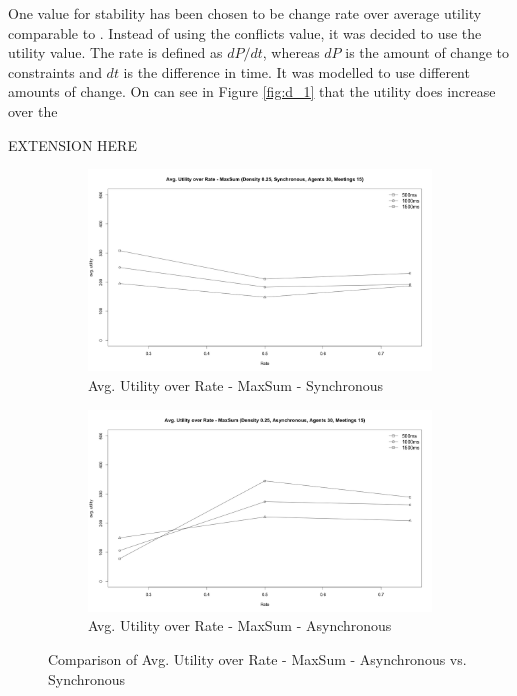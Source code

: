One value for stability has been chosen to be change rate over average utility comparable to \cite{Maillera}. Instead of using the conflicts value, it was decided to use the utility value. The rate is defined as \(dP/dt\), whereas \(dP\) is the amount of change to constraints and \(dt\) is the difference in time. It was modelled to use different amounts of change. On can see in Figure \ref{fig:d_1} that the utility does increase over the 

EXTENSION HERE

\begin{figure}[H]
\centering
\begin{subfigure}{0.5\textwidth}
  \centering
  \includegraphics[width=1\linewidth]{graphics/experiments/dynamic/d_2.png}
  \caption{Avg. Utility over Rate - MaxSum - Synchronous}
  \label{fig:d_2}
\end{subfigure}%
\begin{subfigure}{0.5\textwidth}
  \centering
  \includegraphics[width=1\linewidth]{graphics/experiments/dynamic/d_3.png}
  \caption{Avg. Utility over Rate - MaxSum - Asynchronous}
  \label{fig:d_3}
\end{subfigure}
\caption{Comparison of Avg. Utility over Rate - MaxSum - Asynchronous vs. Synchronous}
\label{fig:test}
\end{figure}

